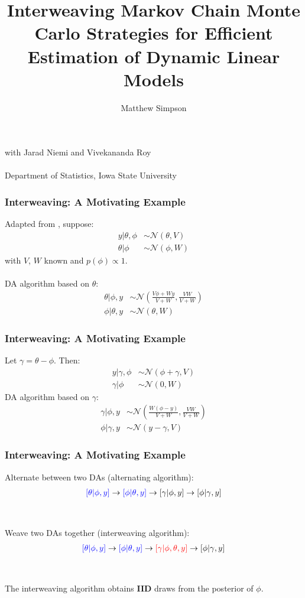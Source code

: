 \documentclass[xcolor=dvipsnames]{beamer}
\title[Interweaving MCMC Strats for DLMs]{Interweaving Markov Chain Monte Carlo Strategies for Efficient
Estimation of Dynamic Linear Models}
\author[M. Simpson]{Matthew Simpson}
\date{}
\institute[Deps of Stat \& Econ, ISU]{Departments of Statistics and Economics, Iowa State University}
\newcommand\N{\mathcal{N}}
\begin{document}
\begin{frame}
\titlepage
\begin{center}
with Jarad Niemi and Vivekananda Roy\\~\\
\scriptsize{Department of Statistics, Iowa State University}
\end{center}
\end{frame}

\begin{frame}
\frametitle{Interweaving: A Motivating Example}
Adapted from \citet{yu2011center}, suppose:
\begin{align*}
y|\theta, \phi & \sim \N(\theta, V) \\
\theta|\phi & \sim \N(\phi, W) 
\end{align*}
with $V$, $W$ known and $p(\phi)\propto 1$.\\~\\

DA algorithm based on $\theta$:
\begin{align*}
\theta|\phi,y &\sim \N\left(\frac{V\phi + Wy}{V+W}, \frac{VW}{V+W}\right)\\
\phi |\theta, y &\sim \N(\theta, W)
\end{align*}
\end{frame}

\begin{frame}
\frametitle{Interweaving: A Motivating Example}
Let $\gamma = \theta - \phi$. Then:
\begin{align*}
y|\gamma, \phi & \sim \N(\phi + \gamma, V) \\
\gamma|\phi & \sim \N(0, W) 
\end{align*}
DA algorithm based on $\gamma$:
\begin{align*}
\gamma|\phi,y &\sim \N\left(\frac{W(\phi - y)}{V+W}, \frac{VW}{V+W}\right)\\
\phi |\gamma, y &\sim \N(y-\gamma, V)
\end{align*}
\end{frame}

\begin{frame}
\frametitle{Interweaving: A Motivating Example}
Alternate between two DAs (alternating algorithm):
\begin{align*}
{\color{blue}[\theta|\phi,y]} \to {\color{blue}[\phi|\theta,y]} \to [\gamma|\phi,y] \to [\phi|\gamma,y]
\end{align*}\\~\\
Weave two DAs together (interweaving algorithm):
\begin{align*}
{\color{blue}[\theta|\phi,y]} \to {\color{blue}[\phi|\theta,y]} \to {\color{red}[\gamma|\phi,\theta,y]} \to [\phi|\gamma,y]
\end{align*}\\~\\\pause
The interweaving algorithm obtains {\bf IID} draws from the posterior of $\phi$.
\end{frame}
\end{document}
